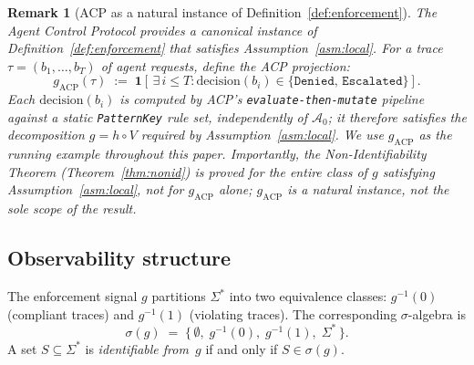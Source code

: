 \documentclass[11pt]{article}
\newtheorem{remark}{Remark}[section]
\newcommand{\Sigstar}{\Sigma^{*}}
\newcommand{\Azero}{\mathcal{A}_0}
\newcommand{\sigg}{\sigma(g)}
\begin{document}
\begin{remark}[ACP as a natural instance of Definition~\ref{def:enforcement}]
\label{rem:acp-instance}
The Agent Control Protocol \citep{fernandez2026acp} provides a canonical
instance of Definition~\ref{def:enforcement} that satisfies
Assumption~\ref{asm:local}.  For a trace $\tau = (b_1,\ldots,b_T)$ of
agent requests, define the ACP projection:
\[
  g_{\mathrm{ACP}}(\tau)
  \;:=\;
  \mathbf{1}\!\left[\,\exists\,i \leq T :
    \mathrm{decision}(b_i) \in \{\texttt{Denied},\,\texttt{Escalated}\}
  \right].
\]
Each $\mathrm{decision}(b_i)$ is computed by ACP's
\texttt{evaluate-then-mutate} pipeline against a static
\texttt{PatternKey} rule set, independently of $\Azero$; it therefore
satisfies the decomposition $g = h \circ V$ required by
Assumption~\ref{asm:local}.
We use $g_{\mathrm{ACP}}$ as the running example throughout this paper.
Importantly, the Non-Identifiability Theorem (Theorem~\ref{thm:nonid}) is
proved for the \emph{entire class} of $g$ satisfying
Assumption~\ref{asm:local}, not for $g_{\mathrm{ACP}}$ alone; $g_{\mathrm{ACP}}$
is a natural \emph{instance}, not the sole scope of the result.
\end{remark}

\subsection{Observability structure}

The enforcement signal $g$ partitions $\Sigstar$ into two equivalence classes:
$g^{-1}(0)$ (compliant traces) and $g^{-1}(1)$ (violating traces).  The
corresponding $\sigma$-algebra is
\[
  \sigg \;=\; \bigl\{\,\emptyset,\; g^{-1}(0),\; g^{-1}(1),\; \Sigstar\,\bigr\}.
\]
A set $S \subseteq \Sigstar$ is \emph{identifiable from~$g$} if and only if
$S \in \sigg$.
\end{document}
